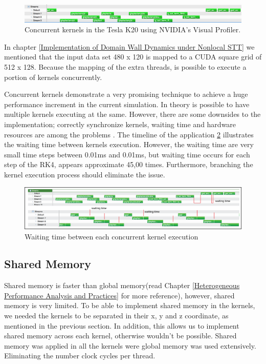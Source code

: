 \begin{figure}[htbp]
	\centering
		\includegraphics[width=1.0\textwidth]{Figures/concurent.png}
		\smallskip
	\caption[Streams kernels Tesla K20]{Concurrent kernels in the Tesla K20 using NVIDIA's Visual Profiler.}
	\label{fig:concurrent}
\end{figure}

In chapter \ref{Implementation of Domain Wall Dynamics under Nonlocal STT} we mentioned that the input data set 480 x 120 is mapped to a CUDA square grid of 512 x 128. Because the mapping of the extra threads, is possible to execute a portion of kernels concurrently.

Concurrent kernels demonstrate a very promising technique to achieve a huge performance increment in the current simulation. In theory is possible to have multiple kernels executing at the same. However, there are some downsides to the implementation; correctly synchronize kernels, waiting time and hardware resources are among the  problems \cite{practices}. The timeline of the application \ref{fig:waittime} illustrates the waiting time between kernels execution. However, the waiting time are very small time steps between 0.01ms and 0.01ms, but waiting time occurs for each step of the RK4, appears approximate 45,00 times. Furthermore, branching the kernel execution process should eliminate the issue.

\begin{figure}[htbp]
	\centering
		\includegraphics[width=1.0\textwidth]{Figures/waittime.png}
		\smallskip
	\caption[Waiting time in concurrent kernels]{Waiting time between each concurrent kernel execution}
	\label{fig:waittime}
\end{figure}


\subsection{Shared Memory}

Shared memory is faster than global memory(read Chapter \ref{Heterogeneous Performance Analysis and Practices} for more reference), however, shared memory is very limited. To be able to implement shared memory in the kernels, we needed the kernels to be separated in their x, y and z coordinate, as mentioned in the previous section. In addition, this allows us to implement shared memory across each kernel, otherwise wouldn't be possible. Shared memory was applied in all the kernels were global memory was used extensively. Eliminating the number clock cycles per thread.


